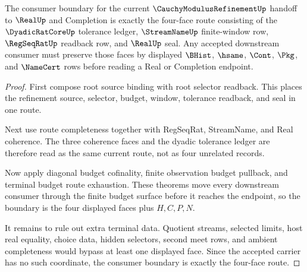 \begin{theorem}
\label{thm:cauchy-modulus-refinement-four-face-consumer-boundary}
The consumer boundary for the current $\CauchyModulusRefinementUp$ handoff to $\RealUp$ and Completion is exactly the four-face route consisting of the $\DyadicRatCoreUp$ tolerance ledger, $\StreamNameUp$ finite-window row, $\RegSeqRatUp$ readback row, and $\RealUp$ seal. Any accepted downstream consumer must preserve those faces by displayed $\BHist$, $\hsame$, $\Cont$, $\Pkg$, and $\NameCert$ rows before reading a Real or Completion endpoint.
\end{theorem}
\begin{proof}
First compose root source binding with root selector readback. This places the refinement source, selector, budget, window, tolerance readback, and seal in one route.

Next use route completeness together with RegSeqRat, StreamName, and Real coherence. The three coherence faces and the dyadic tolerance ledger are therefore read as the same current route, not as four unrelated records.

Now apply diagonal budget cofinality, finite observation budget pullback, and terminal budget route exhaustion. These theorems move every downstream consumer through the finite budget surface before it reaches the endpoint, so the boundary is the four displayed faces plus $H,C,P,N$.

It remains to rule out extra terminal data. Quotient streams, selected limits, host real equality, choice data, hidden selectors, second meet rows, and ambient completeness would bypass at least one displayed face. Since the accepted carrier has no such coordinate, the consumer boundary is exactly the four-face route.
\end{proof}

